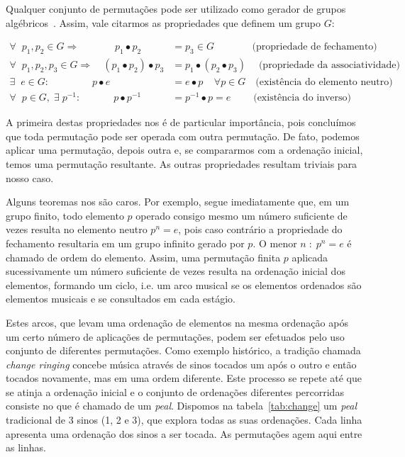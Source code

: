 Qualquer conjunto de permutações pode ser utilizado como gerador de grupos algébricos~\cite{groups}. Assim, vale citarmos as propriedades que definem um grupo $G$:

\begin{equation}\label{eq:groups}
\begin{split}
\forall \;\; p_1,p_2 \in G \Rightarrow\quad\quad\quad\;\; p_1 \bullet p_2 & = p_3 \in G  \quad\quad\quad\;\;\;\text{(propriedade de fechamento)} \\
\forall \;\; p_1,p_2,p_3 \in G \Rightarrow\quad (p_1\bullet p_2)\bullet p_3 & = p_1\bullet (p_2\bullet p_3)\quad\;  \text{(propriedade da associatividade)} \\
\exists \;\; e \in G :\quad\quad\quad\quad\; p \bullet e & = e \bullet p \;\;\;\; \forall p \in G  \quad \text{(existência do elemento neutro)} \\
\forall \;\; p \in G, \;\exists\; p^{-1} :\quad\quad\quad\;  p\bullet p^{-1} & =p^{-1}\bullet p = e  \quad\quad\;\text{(existência do inverso)}
\end{split}
\end{equation}


A primeira destas propriedades nos é de particular importância, pois concluímos que toda permutação pode ser operada com outra permutação. De fato, podemos aplicar uma permutação, depois outra e, se compararmos com a ordenação inicial, temos uma permutação resultante. As outras propriedades resultam triviais para nosso caso.

Alguns teoremas nos são caros. Por exemplo, segue imediatamente que, em um grupo finito, todo elemento $p$ operado consigo mesmo um número suficiente de vezes resulta no elemento neutro $p^n=e$, pois caso contrário a propriedade do fechamento resultaria em um grupo infinito gerado por $p$. O menor $n\;:\;p^n=e$ é chamado de ordem do elemento. Assim, uma permutação finita $p$ aplicada sucessivamente um número suficiente de vezes resulta na ordenação inicial dos elementos, formando um ciclo, i.e. um arco musical se os elementos ordenados são elementos musicais e se consultados em cada estágio.

Estes arcos, que levam uma ordenação de elementos na mesma ordenação após um certo número de aplicações de permutações, podem ser efetuados pelo uso conjunto de diferentes permutações. Como exemplo
histórico, a tradição chamada \emph{change ringing} concebe música através de sinos tocados um após o outro e então tocados novamente, mas em uma ordem diferente. Este processo se repete até que se atinja a ordenação inicial e o conjunto de ordenações diferentes percorridas consiste no que é chamado de um \emph{peal}. Dispomos na tabela~\ref{tab:change} um \emph{peal} tradicional de 3 sinos (1, 2 e 3), que explora todas as suas ordenações. Cada linha apresenta uma ordenação dos sinos a ser tocada. As permutações agem aqui entre as linhas.

